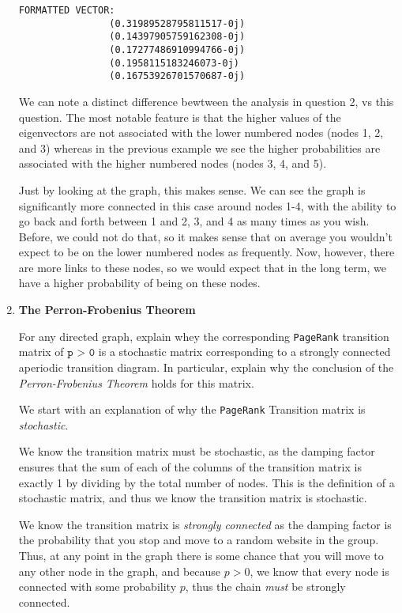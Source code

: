 \documentclass[11pt]{article}
\begin{document}
\begin{enumerate}
\begin{minipage}[t]{0.48\linewidth}
\begin{lstlisting}[basicstyle=\ttfamily\footnotesize, gobble=8]
                FORMATTED VECTOR:
                (0.31989528795811517-0j)
                (0.14397905759162308-0j)
                (0.17277486910994766-0j)
                (0.1958115183246073-0j)
                (0.16753926701570687-0j)
            \end{lstlisting}
        \end{minipage}

        We can note a distinct difference bewtween the analysis in question 2,
        vs this question. The most notable feature is that the higher values of
        the eigenvectors are not associated with the lower numbered nodes
        (nodes 1, 2, and 3) whereas in the previous example we see the higher
        probabilities are associated with the higher numbered nodes (nodes 3,
        4, and 5). 

        Just by looking at the graph, this makes sense. We can see the graph is
        significantly more connected in this case around nodes 1-4, with the
        ability to go back and forth between 1 and 2, 3, and 4 as many times as
        you wish. Before, we could not do that, so it makes sense that on
        average you wouldn't expect to be on the lower numbered nodes as
        frequently. Now, however, there are more links to these nodes, so we
        would expect that in the long term, we have a higher probability of
        being on these nodes.
        \medskip


    \item  \textbf{The Perron-Frobenius Theorem}

        For any directed graph, explain whey the corresponding
        \texttt{PageRank} transition matrix of $\texttt{p > 0}$ is a stochastic
        matrix corresponding to a strongly connected aperiodic transition
        diagram. In particular, explain why the conclusion of the
        \textit{Perron-Frobenius Theorem} holds for this matrix.

        We start with an explanation of why the \texttt{PageRank} Transition
        matrix is \textit{stochastic}.

        We know the transition matrix must be stochastic, as the damping factor
        ensures that the sum of each of the columns of the transition matrix is
        exactly 1 by dividing by the total number of nodes. This is the
        definition of a stochastic matrix, and thus we know the transition
        matrix is stochastic.

        We know the transition matrix is \textit{strongly connected} as the
        damping factor is the probability that you stop and move to a random
        website in the group. Thus, at any point in the graph there is some
        chance that you will move to any other node in the graph, and
        because $p > 0$, we know that every node is connected with some
        probability $p$, thus the chain \textit{must} be strongly connected.


\end{enumerate}
\end{document}
